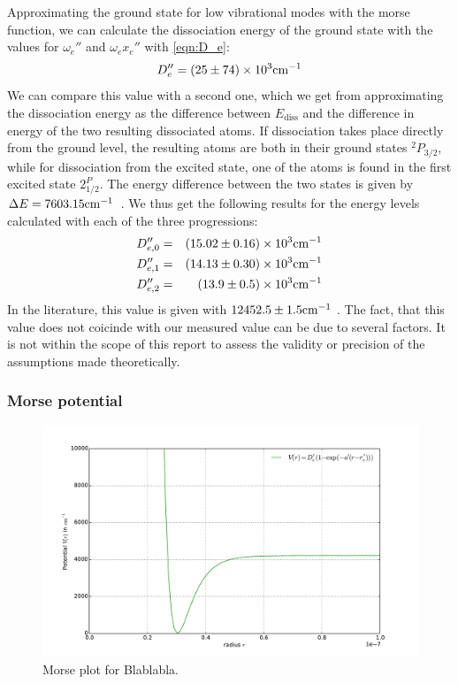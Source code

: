 Approximating the ground state for low vibrational modes with the morse function, 
we can calculate the dissociation energy of the ground state with the values for 
$\omega_e''$ and $\omega_e x_e''$ with \eqref{eqn:D_e}:
\begin{equation}
    D_e'' =\left(25 \pm 74\right) \times 10^{3} \mathrm{cm^{-1}}
\end{equation}
We can compare this value with a second one, which we get from approximating the 
dissociation energy as the difference between $E_\mathrm{diss}$ and the difference in 
energy of the two resulting dissociated atoms. If dissociation takes place directly 
from the ground level, the resulting atoms are both in their ground states $^2 P_{3/2}$, 
while for dissociation from the excited state, one of the atoms is found in the first 
excited state $2^ P_{1/2}$. The energy difference between the two states is given by 
$\Delta E = 7603.15 \mathrm{cm^{-1}}$~\cite{nist}. We thus get the following results for the energy 
levels calculated with each of the three progressions:
\begin{eqnarray}
    D_{e, 0}'' &=&\left(15.02 \pm 0.16\right) \times 10^{3} \mathrm{cm^{-1}} \\
    D_{e, 1}'' &=&\left(14.13 \pm 0.30\right) \times 10^{3} \mathrm{cm^{-1}} \\
    D_{e, 2}'' &=&\left(13.9 \pm 0.5\right) \times 10^{3} \mathrm{cm^{-1}}
\end{eqnarray}
In the literature, this value is given with $12452.5 \pm 1.5 \mathrm{cm^{-1}}$ \cite{leroy1970spectroscopic}. 
The fact, that this value 
does not coicinde with our measured value can be due to several factors. 
It is not within the scope of this report to assess the validity or precision of 
the assumptions made theoretically.

\subsubsection{Morse potential}
\begin{figure}
    \centering
    \includegraphics[width=\pltw]{analysis/figures/morse_plot_0.pdf}
    \caption{Morse plot for Blablabla.  
    }
    \label{fig:morse}
\end{figure}














